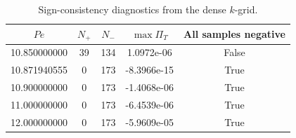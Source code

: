 \begin{table}[htbp]
\centering
\caption{Sign-consistency diagnostics from the dense $k$-grid.}
\label{tab:ultimate_sign_check}
\begin{ruledtabular}
\begin{tabular}{ccccc}
$Pe$ & $N_+$ & $N_-$ & $\max \Pi_T$ & All samples negative\\
\hline
10.850000000 & 39 & 134 & 1.0972e-06 & False\\
10.871940555 & 0 & 173 & -8.3966e-15 & True\\
10.900000000 & 0 & 173 & -1.4068e-06 & True\\
11.000000000 & 0 & 173 & -6.4539e-06 & True\\
12.000000000 & 0 & 173 & -5.9609e-05 & True\\
\end{tabular}
\end{ruledtabular}
\end{table}
